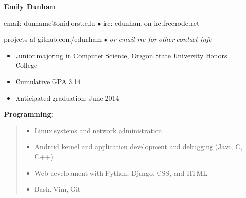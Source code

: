 \documentclass[11pt]{article}
\begin{document}
\centerline{{\LARGE \bf Emily Dunham}}

\bigskip

\centerline{email: dunhame@onid.orst.edu
        $\bullet$
        irc: edunham on irc.freenode.net}
\centerline{projects at github.com/edunham 
        $\bullet$
        \emph{or email me for other contact info}}

\hrulefill

\bigskip

\begin{itemize}

    \item Junior majoring in Computer Science, Oregon State University 
          Honors College

    \item Cumulative GPA 3.14

    \item Anticipated graduation: June 2014

\end{itemize}

\bigskip
\hrulefill
\bigskip


\smallskip

{\large \bf Programming:}
\begin{quote}
\begin{itemize}
    \item Linux systems and network administration
    \item Android kernel and application development and debugging (Java, C, C++)
    \item Web development with Python, Django, CSS, and HTML
    \item Bash, Vim, Git
\end{itemize}
\end{quote}
\end{document}
